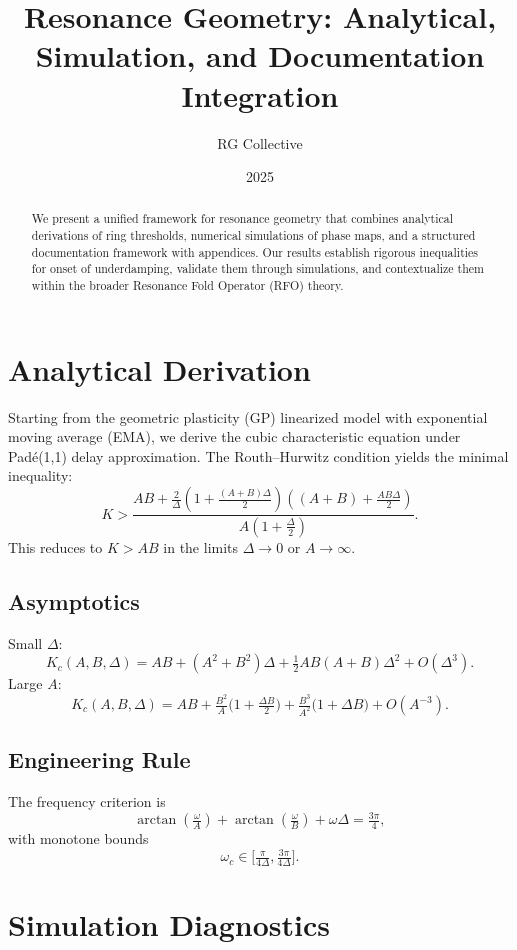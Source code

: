 \documentclass[12pt]{article}
\title{Resonance Geometry: Analytical, Simulation, and Documentation Integration}
\author{RG Collective}
\date{2025}
\begin{document}
\maketitle

\begin{abstract}
We present a unified framework for resonance geometry that combines
analytical derivations of ring thresholds, numerical simulations
of phase maps, and a structured documentation framework with
appendices. Our results establish rigorous inequalities for
onset of underdamping, validate them through simulations, and contextualize
them within the broader Resonance Fold Operator (RFO) theory.
\end{abstract}

\section{Analytical Derivation}

Starting from the geometric plasticity (GP) linearized model with exponential moving
average (EMA), we derive the cubic characteristic equation under Padé(1,1) delay
approximation. The Routh–Hurwitz condition yields the minimal inequality:
\[
K > \frac{ AB + \tfrac{2}{\Delta}\left(1 + \tfrac{(A+B)\Delta}{2}\right)\left((A+B) + \tfrac{AB\Delta}{2}\right) }{ A\left(1 + \tfrac{\Delta}{2}\right) } .
\]
This reduces to $K>AB$ in the limits $\Delta \to 0$ or $A \to \infty$.

\subsection{Asymptotics}
Small $\Delta$:
\[
K_c(A,B,\Delta) = AB + (A^2 + B^2)\Delta + \tfrac{1}{2}AB(A+B)\Delta^2 + O(\Delta^3).
\]
Large $A$:
\[
K_c(A,B,\Delta) = AB + \tfrac{B^2}{A}\Big(1 + \tfrac{\Delta B}{2}\Big) + \tfrac{B^3}{A^2}\Big(1 + \Delta B\Big) + O(A^{-3}).
\]

\subsection{Engineering Rule}
The frequency criterion is
\[
\arctan(\tfrac{\omega}{A}) + \arctan(\tfrac{\omega}{B}) + \omega \Delta = \tfrac{3\pi}{4},
\]
with monotone bounds
\[
\omega_c \in \Big[\tfrac{\pi}{4\Delta}, \tfrac{3\pi}{4\Delta}\Big].
\]

\section{Simulation Diagnostics}
\end{document}
